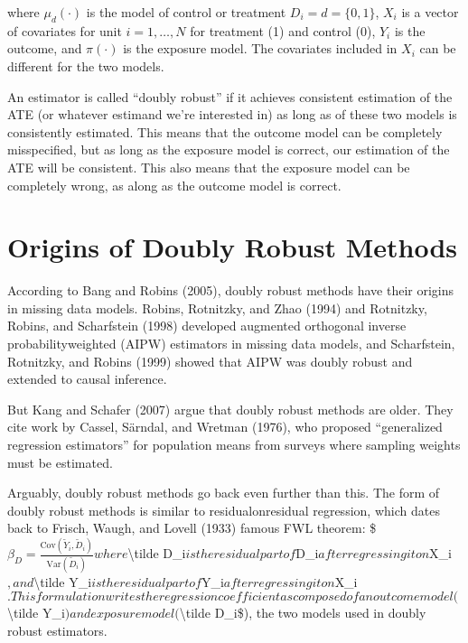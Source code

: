 \documentclass[letterpaper,10pt,english]{jupyterBook}
\begin{document}
\sphinxAtStartPar
where \(\mu_d(\cdot)\) is the model of control or treatment \(D_i = d=\{0, 1\}\), \(X_i\) is a vector of covariates for unit \(i = 1, \ldots, N\) for treatment (1) and control (0), \(Y_i\) is the outcome, and \(\pi(\cdot)\) is the exposure model. The covariates included in \(X_i\) can be different for the two models.

\sphinxAtStartPar
An estimator is called “doubly robust” if it achieves consistent estimation of the ATE (or whatever estimand we’re interested in) as long as  of these two models is consistently estimated. This means that the outcome model can be completely misspecified, but as long as the exposure model is correct, our estimation of the ATE will be consistent. This also means that the exposure model can be completely wrong, as along as the outcome model is correct.


\section{Origins of Doubly Robust Methods}
\label{\detokenize{Introduction and Conceptual Overview:origins-of-doubly-robust-methods}}
\sphinxAtStartPar
According to Bang and Robins (2005), doubly robust methods have their origins in missing data models. Robins, Rotnitzky, and Zhao (1994) and Rotnitzky, Robins, and Scharfstein (1998) developed augmented orthogonal inverse probability\sphinxhyphen{}weighted (AIPW) estimators in missing data models, and Scharfstein, Rotnitzky, and Robins (1999) showed that AIPW was doubly robust and extended to causal inference.

\sphinxAtStartPar
But Kang and Schafer (2007) argue that doubly robust methods are older. They cite work by Cassel, Särndal, and Wretman (1976), who proposed “generalized regression estimators” for population means from surveys where sampling weights must be estimated.

\sphinxAtStartPar
Arguably, doubly robust methods go back even further than this. The form of doubly robust methods is similar to residual\sphinxhyphen{}on\sphinxhyphen{}residual regression, which dates back to Frisch, Waugh, and Lovell (1933) famous FWL theorem:
\$\(\beta_D = \frac{\text{Cov}(\tilde Y_i, \tilde D_i)}{\text{Var}(\tilde D_i)}\)\(
where \)\textbackslash{}tilde D\_i\( is the residual part of \)D\_i\( after regressing it on \)X\_i\(, and \)\textbackslash{}tilde Y\_i\( is the residual part of \)Y\_i\( after regressing it on \)X\_i\(. This formulation writes the regression coefficient as composed of an outcome model (\)\textbackslash{}tilde Y\_i\() and exposure model (\)\textbackslash{}tilde D\_i\$), the two models used in doubly robust estimators.
\end{document}
